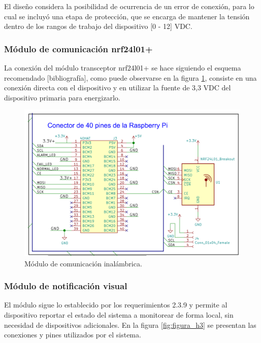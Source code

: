 El diseño considera la posibilidad de ocurrencia de un error de conexión, para lo cual se incluyó una etapa de protección, que se encarga de mantener la tensión dentro de los rangos de trabajo del dispositivo [0 - 12] VDC.

\subsubsection{Módulo de comunicación nrf24l01+}

La conexión del módulo transceptor nrf24l01+ se hace siguiendo el esquema recomendado [bibliografía], como puede observarse en la figura \ref{fig:figura_g3}, consiste en una conexión directa con el dispositivo y en utilizar la fuente de 3,3 VDC del dispositivo primaria para energizarlo.  

\begin{figure}[]
	\centering
	\includegraphics[scale=.35]{./Figures/Capitulo3/Fig_G3.png}
	\caption{Módulo de comunicación inalámbrica.}
	\label{fig:figura_g3}
\end{figure} 

\subsubsection{Módulo de notificación visual}

El módulo sigue lo establecido por los requerimientos  2.3.9 y permite al dispositivo reportar el estado del sistema a monitorear de forma local, sin necesidad de dispositivos adicionales. En la figura \ref{fig:figura_h3} se presentan las conexiones y pines utilizados por el sistema.

